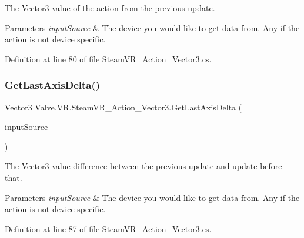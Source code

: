 The Vector3 value of the action from the previous update. 


\begin{DoxyParams}{Parameters}
{\em input\+Source} & The device you would like to get data from. Any if the action is not device specific.\\
\hline
\end{DoxyParams}


Definition at line 80 of file Steam\+V\+R\+\_\+\+Action\+\_\+\+Vector3.\+cs.

\mbox{\label{class_valve_1_1_v_r_1_1_steam_v_r___action___vector3_a0c287b4a3eb4bffb3da860ae73f28981}} 
\subsubsection{\texorpdfstring{GetLastAxisDelta()}{GetLastAxisDelta()}}
{\footnotesize\ttfamily Vector3 Valve.\+V\+R.\+Steam\+V\+R\+\_\+\+Action\+\_\+\+Vector3.\+Get\+Last\+Axis\+Delta (\begin{DoxyParamCaption}\item[{\mbox{\hyperlink{namespace_valve_1_1_v_r_a82e5bf501cc3aa155444ee3f0662853f}{Steam\+V\+R\+\_\+\+Input\+\_\+\+Sources}}}]{input\+Source }\end{DoxyParamCaption})}



The Vector3 value difference between the previous update and update before that. 


\begin{DoxyParams}{Parameters}
{\em input\+Source} & The device you would like to get data from. Any if the action is not device specific.\\
\hline
\end{DoxyParams}


Definition at line 87 of file Steam\+V\+R\+\_\+\+Action\+\_\+\+Vector3.\+cs.

\mbox{\label{class_valve_1_1_v_r_1_1_steam_v_r___action___vector3_a6df7d004d3dd3667283d6835b5aa6b15}} 
